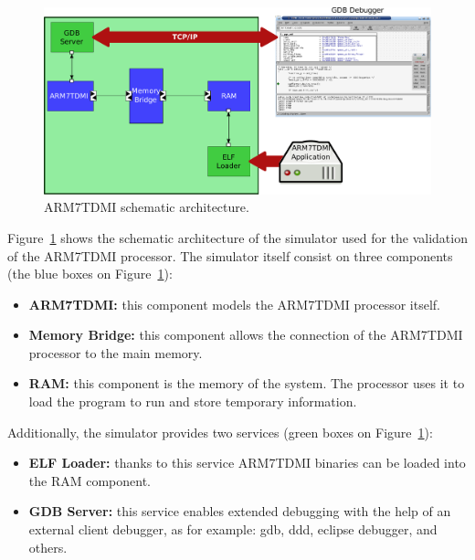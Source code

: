 \begin{figure}[!h]
	\begin{center}
		\includegraphics[width=\textwidth]{arm7tdmi_validation/figures/ARM7TDMI_architecture.pdf}
	\end{center}
	\caption{ARM7TDMI schematic architecture.}
	\label{fig:arm7tdmi_architecture}
\end{figure}

Figure~\ref{fig:arm7tdmi_architecture} shows the schematic architecture of the simulator used for the validation of the ARM7TDMI processor.
The simulator itself consist on three components (the blue boxes on Figure~\ref{fig:arm7tdmi_architecture}):
\begin{itemize}
	\item \textbf{ARM7TDMI:} this component models the ARM7TDMI processor itself.
	\item \textbf{Memory Bridge:} this component allows the connection of the ARM7TDMI processor to the main memory.
	\item \textbf{RAM:} this component is the memory of the system. The processor uses it to load the program to run and store temporary information.
\end{itemize}

Additionally, the simulator provides two services (green boxes on Figure~\ref{fig:arm7tdmi_architecture}):
\begin{itemize}
	\item \textbf{ELF Loader:} thanks to this service ARM7TDMI binaries can be loaded into the RAM component.
	\item \textbf{GDB Server:} this service enables extended debugging with the help of an external client debugger, as for example: gdb, ddd, eclipse debugger, and others.
\end{itemize}
